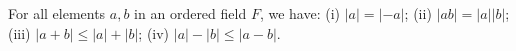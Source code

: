 For all elements $a, b$ in an ordered field $F$, we have:
(i) $|a| = |-a|$;
(ii) $|ab| = |a||b|$;
(iii) $|a + b| \leq |a| + |b|$;
(iv) $|a| - |b| \leq |a - b|$.